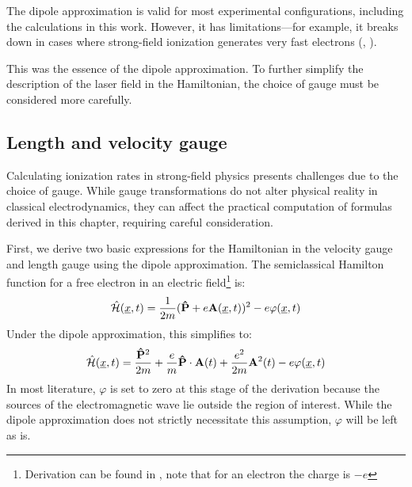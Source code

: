 The dipole approximation is valid for most experimental configurations, including the calculations in this work. 
However, it has limitations—for example, it breaks down in cases where strong-field ionization generates very fast electrons (\cite{bosmandipoleapprox}, \cite{breakdowndipoleapprox}).

This was the essence of the dipole approximation.
To further simplify the description of the laser field in the Hamiltonian, the choice of gauge must be considered more carefully.






\subsection{Length and velocity gauge}
Calculating ionization rates in strong-field physics presents challenges due to the choice of gauge. While gauge transformations do not alter physical reality in classical electrodynamics, they can affect the practical computation of formulas derived in this chapter, requiring careful consideration.

First, we derive two basic expressions for the Hamiltonian in the velocity gauge and length gauge using the dipole approximation. 
The semiclassical Hamilton function for a free electron in an electric field\footnote{Derivation can be found in \cite{LandauLifschitzBand2}, note that for an electron the charge is $-e$} is:%
\begin{equation}%
    \hat{\Hs}(\uvec{x}, t) = \frac{1}{2m}(\vec{\hat{P}} + e \vec{A}(\uvec{x}, t))^2 - e \varphi(\uvec{x}, t) \label{eq:semiClassicalHamilton}
\end{equation}
Under the dipole approximation, this simplifies to:
\begin{equation*}
    \hat{\mathcal{H}}(\underline{x}, t) = \frac{\mathbf{\hat{P}}^2}{2m} + \frac{e}{m}\mathbf{\hat{P}}\cdot \mathbf{A}(t) + \frac{e^2}{2m}\mathbf{A}^2(t) - e \varphi(\underline{x}, t)
\end{equation*}
In most literature, $\varphi$ is set to zero at this stage of the derivation because the sources of the electromagnetic wave lie outside the region of interest.
While the dipole approximation does not strictly necessitate this assumption, $\varphi$ will be left as is.

